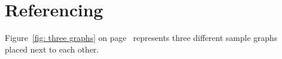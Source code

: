 \section{Referencing}
Figure~\ref{fig: three graphs} on page~\pageref{fig: three graphs} represents three different sample graphs placed next to each other.\\